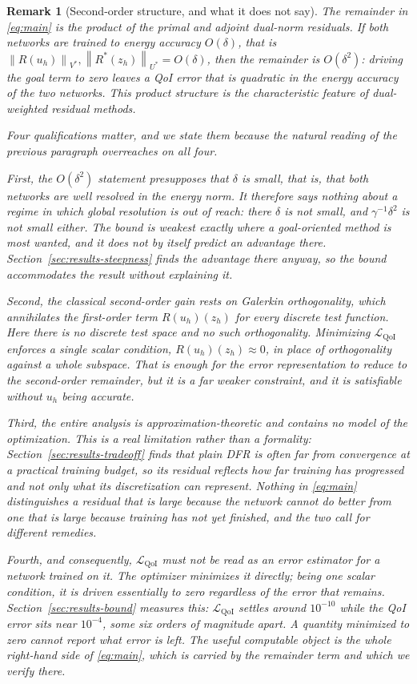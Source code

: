 \documentclass[preprint,11pt]{elsarticle}
\newtheorem{remark}[theorem]{Remark}
\newcommand{\norm}[1]{\left\|#1\right\|}
\begin{document}
\begin{remark}[Second-order structure, and what it does not say]
\label{rem:second-order}
The remainder in \eqref{eq:main} is the \emph{product} of the primal and adjoint dual-norm residuals. If both networks are trained to energy accuracy $O(\delta)$, that is $\norm{R(u_h)}_{V^*}, \norm{R^*(z_h)}_{U^*} = O(\delta)$, then the remainder is $O(\delta^2)$: driving the goal term to zero leaves a QoI error that is quadratic in the energy accuracy of the two networks. This product structure is the characteristic feature of dual-weighted residual methods.

Four qualifications matter, and we state them because the natural reading of the previous paragraph overreaches on all four.

First, the $O(\delta^2)$ statement presupposes that $\delta$ is small, that is, that both networks \emph{are} well resolved in the energy norm. It therefore says nothing about a regime in which global resolution is out of reach: there $\delta$ is not small, and $\gamma^{-1}\delta^2$ is not small either. The bound is weakest exactly where a goal-oriented method is most wanted, and it does not by itself predict an advantage there. Section~\ref{sec:results-steepness} finds the advantage there anyway, so the bound accommodates the result without explaining it.

Second, the classical second-order gain rests on Galerkin orthogonality, which annihilates the first-order term $R(u_h)(z_h)$ for every discrete test function. Here there is no discrete test space and no such orthogonality. Minimizing $\mathcal{L}_{\mathrm{QoI}}$ enforces a single scalar condition, $R(u_h)(z_h) \approx 0$, in place of orthogonality against a whole subspace. That is enough for the error representation to reduce to the second-order remainder, but it is a far weaker constraint, and it is satisfiable without $u_h$ being accurate.

Third, the entire analysis is approximation-theoretic and contains no model of the optimization. This is a real limitation rather than a formality: Section~\ref{sec:results-tradeoff} finds that plain DFR is often far from convergence at a practical training budget, so its residual reflects how far training has progressed and not only what its discretization can represent. Nothing in \eqref{eq:main} distinguishes a residual that is large because the network cannot do better from one that is large because training has not yet finished, and the two call for different remedies.

Fourth, and consequently, $\mathcal{L}_{\mathrm{QoI}}$ must not be read as an error \emph{estimator} for a network trained on it. The optimizer minimizes it directly; being one scalar condition, it is driven essentially to zero regardless of the error that remains. Section~\ref{sec:results-bound} measures this: $\mathcal{L}_{\mathrm{QoI}}$ settles around $10^{-10}$ while the QoI error sits near $10^{-4}$, some six orders of magnitude apart. A quantity minimized to zero cannot report what error is left. The useful computable object is the whole right-hand side of \eqref{eq:main}, which is carried by the remainder term and which we verify there.
\end{remark}
\end{document}
